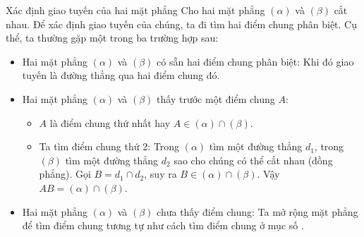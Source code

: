 \begin{dang}{Xác định giao tuyến của hai mặt phẳng}
	Cho hai mặt phẳng $(\alpha)$ và $(\beta)$ cắt nhau. Để xác định giao tuyến của chúng, ta đi tìm hai điểm chung phân biệt. Cụ thể, ta thường gặp một trong ba trường hợp sau:
\begin{itemize}
		\item [\ding{172}] Hai mặt phẳng $(\alpha)$ và $(\beta)$ có sẵn hai điểm chung phân biệt: Khi đó giao tuyến là đường thẳng qua hai điểm chung đó.
		\item [\ding{173}] Hai mặt phẳng  $(\alpha)$ và $(\beta)$ thấy trước một điểm chung $A$:
		\begin{khung4}{}
			\begin{itemize}
				\item [$\bullet$] $A$ là điểm chung thứ nhất hay $A \in (\alpha) \cap (\beta)$.
				\item [$\bullet$] Ta tìm điểm chung thứ 2: Trong $ (\alpha)$ tìm một đường thẳng $d_1$, trong $ (\beta)$ tìm một đường thẳng $d_2$ sao cho chúng có thể cắt nhau (đồng phẳng).			Gọi $B = d_1 \cap d_2$, suy ra $B \in (\alpha) \cap (\beta)$. Vậy $AB=(\alpha) \cap (\beta)$.
		\end{itemize}
		\end{khung4}
		\item [\ding{174}] Hai mặt phẳng  $(\alpha)$ và $(\beta)$ chưa thấy điểm chung: Ta mở rộng mặt phẳng để tìm điểm chung tương tự như cách tìm điểm chung ở mục số .
	\end{itemize}
\end{dang}

